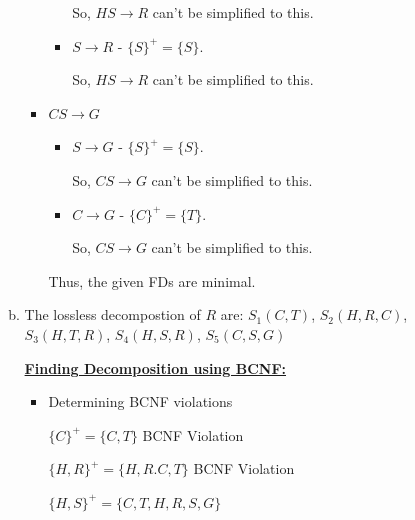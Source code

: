 \documentclass[12pt]{article}
\begin{document}
\begin{enumerate}[1.]
\begin{enumerate}[a)]
\begin{itemize}
\begin{itemize}
                \bigskip

                So, $HS \to R$ can't be simplified to this.

                \item $S \to R$ - $\{S\}^+ = \{S\}$.

                \bigskip

                So, $HS \to R$ can't be simplified to this.
            \end{itemize}
            \item $CS \to G$
            \begin{itemize}
                \item $S \to G$ - $\{S\}^+ = \{S\}$.

                \bigskip

                So, $CS \to G$ can't be simplified to this.

                \item $C \to G$ - $\{C\}^+ = \{T\}$.

                \bigskip

                So, $CS \to G$ can't be simplified to this.
            \end{itemize}

            \bigskip

            Thus, the given FDs are minimal.
        \end{itemize}

        \item

        \bigskip

        The lossless decompostion of $R$ are: $S_1(C,T)$, $S_2(H,R,C)$, $S_3(H,T,R)$, $S_4(H,S,R)$, $S_5(C,S,G)$

        \bigskip

        \underline{\textbf{Finding Decomposition using BCNF:}}

        \bigskip

        \begin{itemize}
            \item Determining BCNF violations

            $\{C\}^+ = \{C,T\}$ \color{red} BCNF Violation\color{black}

            \bigskip

            $\{H,R\}^+ = \{H,R.C,T\}$ \color{red} BCNF Violation\color{black}

            \bigskip

            $\{H,S\}^+ = \{C,T,H,R,S,G\}$


\end{itemize}
\end{enumerate}
\end{enumerate}
\end{document}
